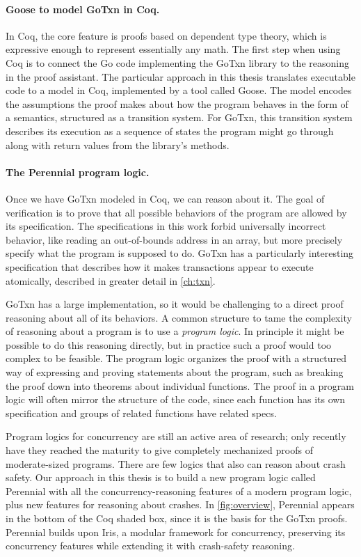 \paragraph{Goose to model GoTxn in Coq.}
In Coq, the core feature is proofs based on dependent type theory, which is
expressive enough to represent essentially any math. The first step when using
Coq is to connect the Go code implementing the GoTxn library to the reasoning in
the proof assistant. The particular approach in this thesis translates
executable code to a model in Coq, implemented by a tool called Goose. The model
encodes the assumptions the proof makes about how the program behaves in the
form of a semantics, structured as a transition system. For GoTxn, this
transition system describes its execution as a sequence of states the program
might go through along with return values from the library's methods.

\paragraph{The Perennial program logic.}
Once we have GoTxn modeled in Coq, we can reason about it. The goal of
verification is to prove that all possible behaviors of the program are allowed
by its specification. The specifications in this work forbid universally
incorrect behavior, like reading an out-of-bounds address in an array, but more
precisely specify what the program is supposed to do. GoTxn has a particularly
interesting specification that describes how it makes transactions appear to
execute atomically, described in greater detail in \cref{ch:txn}.

GoTxn has a large implementation, so it would be challenging to a direct proof
reasoning about all of its behaviors.
A common structure to tame the complexity of reasoning about a program is to use
a \emph{program logic}. In principle it might be possible to do this reasoning
directly, but in practice such a proof would too
complex to be feasible. The program logic organizes the proof with a structured
way of expressing and proving statements about the program, such as breaking the
proof down into theorems about individual functions. The proof in a program
logic will often mirror the structure of the code, since each function has its
own specification and groups of related functions have related specs.

Program logics for concurrency are still an active area of research; only
recently have they reached the maturity to give completely mechanized proofs of
moderate-sized programs. There are few logics that also can reason about crash
safety. Our approach in this thesis is to build a new program logic called Perennial with all the
concurrency-reasoning features of a modern program logic, plus new features for
reasoning about crashes. In \cref{fig:overview}, Perennial appears in the bottom
of the Coq shaded box, since it is the basis for the GoTxn proofs. Perennial builds upon Iris, a modular framework for
concurrency, preserving its concurrency features while extending it with
crash-safety reasoning.

